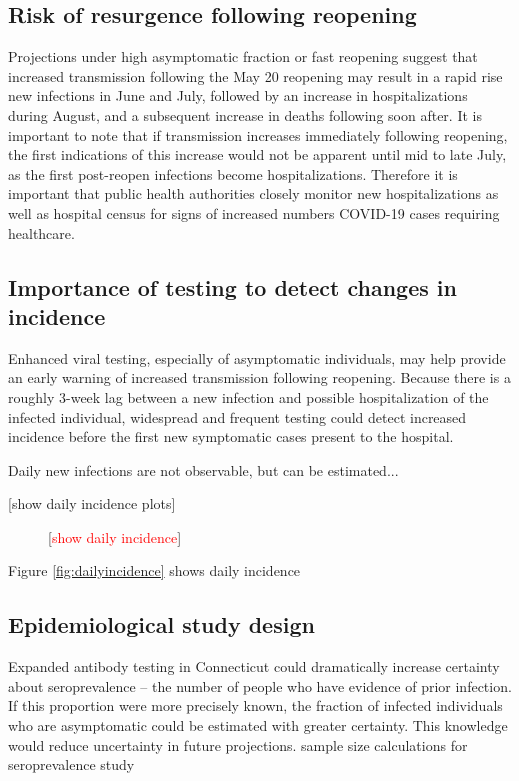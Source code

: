 \documentclass[11pt]{article}
\newcommand{\comment}[1]{[\textcolor{red}{#1}]}
\begin{document}
\subsection*{Risk of resurgence following reopening} 

Projections under high asymptomatic fraction or fast reopening suggest that increased transmission following the May 20 reopening may result in a rapid rise new infections in June and July, followed by an increase in hospitalizations during August, and a subsequent increase in deaths following soon after.  It is important to note that if transmission increases immediately following reopening, the first indications of this increase would not be apparent until mid to late July, as the first post-reopen infections become hospitalizations.  Therefore it is important that public health authorities closely monitor new hospitalizations as well as hospital census for signs of increased numbers COVID-19 cases requiring healthcare.   


\subsection*{Importance of testing to detect changes in incidence}

Enhanced viral testing, especially of asymptomatic individuals, may help provide an early warning of increased transmission following reopening.  Because there is a roughly 3-week lag between a new infection and possible hospitalization of the infected individual, widespread and frequent testing could detect increased incidence before the first new symptomatic cases present to the hospital. 

Daily new infections are not observable, but can be estimated...



[show daily incidence plots]


\begin{figure}
\centering
\caption{\comment{show daily incidence}}
\label{fig:dailyncidence}
\end{figure}

Figure \ref{fig:dailyincidence} shows daily incidence 



\subsection*{Epidemiological study design}

Expanded antibody testing in Connecticut could dramatically increase certainty about seroprevalence -- the number of people who have evidence of prior infection. If this proportion were more precisely known, the fraction of infected individuals who are asymptomatic could be estimated with greater certainty.  This knowledge would reduce uncertainty in future projections.  
sample size calculations for seroprevalence study
\end{document}
